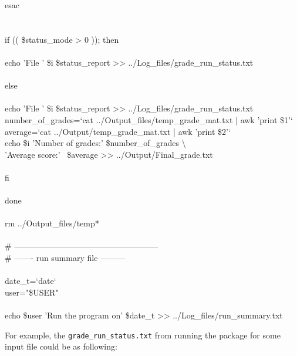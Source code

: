 \begin{mdframed}[hidealllines=true,backgroundcolor=gray!20]
\begin{singlespace}
{{\color{for_pink}esac}\\
\\
\\
{\color{for_pink}if} (( \$status\_mode > 0 )); {\color{for_pink}then}\\
\\
echo {\color{red}'File '} \$i \$status\_report >>  ../Log\_files/grade\_run\_status.txt\\
\\
{\color{for_pink}else}\\
\\
echo {\color{red}'File '} \$i \$status\_report >>  ../Log\_files/grade\_run\_status.txt\\
number\_of\_grades={\color{red}`cat ../Output\_files/temp\_grade\_mat.txt | awk '{print \$1}'`}\\
average={\color{red}`cat ../Output/temp\_grade\_mat.txt | awk '{print \$2}'`}\\
echo \$i {\color{red}'Number of grades:'}  \$number\_of\_grades \textbackslash \\
\phantom{x}\hspace{14ex} {\color{red}'Average score:'} \  \$average >> ../Output/Final\_grade.txt \\
\\
{\color{for_pink}fi}\\
\\
{\color{for_pink}done}\\
\\
rm ../Output\_files/temp*  \\  
\\
{ \color{matlab_green} \# -----------------------------------------------------}\\
{ \color{matlab_green} \# ------- run summary file ---------}\\
\\
date\_t={\color{red}`date`}\\
user={\color{red}"\$USER"}\\
\\
echo  \$user {\color{red}'Run the program on'}  \$date\_t  >> ../Log\_files/run\_summary.txt\\
 }
\end{singlespace}
\end{mdframed}
\vspace{5mm}
\noindent
For example, the \texttt{grade\_run\_status.txt}  from running the package for some input file could be as following:\\

